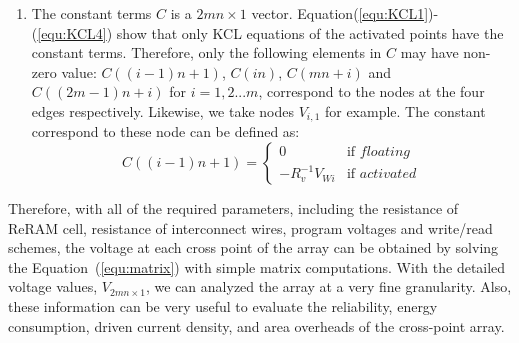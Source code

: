 \begin{enumerate}
  \item The constant terms $C$ is a $2mn{\times}1$ vector. Equation(\ref{equ:KCL1})-(\ref{equ:KCL4}) show that only KCL equations of the activated points have the constant terms. Therefore, only the following elements in $C$ may have non-zero value: $C((i-1)n+1)$, $C(in)$, $C(mn+i)$ and $C((2m-1)n+i)$ for $i=1,2...m$, correspond to the nodes at the four edges respectively. Likewise, we take nodes $V_{i,1}$ for example. The constant correspond to these node can be defined as:
    \begin{equation}
    C((i-1)n+1) = \left\{
    \begin{array}{ll}
    0   & \text{if } floating\\
    -R_v^{-1}V_{Wi}& \text{if } activated
    \end{array} \right.
    \end{equation}
\end{enumerate}

Therefore, with all of the required parameters, including the resistance of ReRAM cell, resistance of interconnect wires, program voltages and write/read schemes, the voltage at each cross point of the array can be obtained by solving the Equation~(\ref{equ:matrix}) with simple matrix computations. With the detailed voltage values, $V_{2mn{\times}1}$, we can analyzed the array at a very fine granularity. Also, these information can be very useful to evaluate the reliability, energy consumption, driven current density, and area overheads of the cross-point array. 